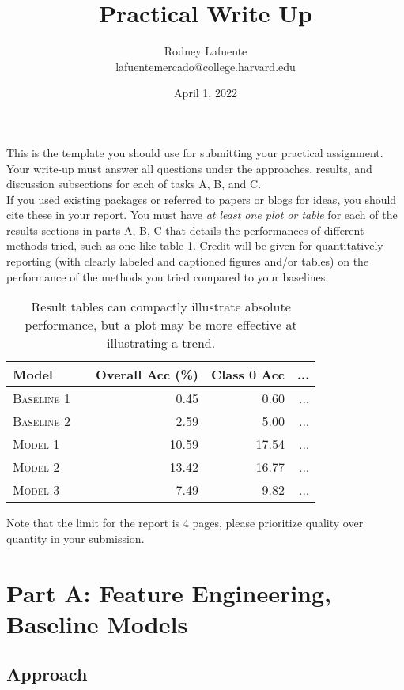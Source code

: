 \documentclass[11pt]{article}
\title{Practical Write Up}
\author{Rodney Lafuente \\ lafuentemercado@college.harvard.edu}
\date{April 1, 2022}
\begin{document}
\maketitle{}


\noindent This is the template you should use for submitting your practical assignment. 
Your write-up must
answer all questions under the approaches, results, and discussion subsections
for each of tasks A, B, and C. \\

\noindent If you used existing packages or referred to papers or blogs for ideas,  you should cite these in your report.  You must have \textit{at least one plot or table}
for each of the results sections in parts A, B, C
that details the performances of different methods tried, such as one like table \ref{tab:results}. Credit will be given for quantitatively reporting (with clearly
labeled and captioned figures and/or tables) on the performance of the
methods you tried compared to your baselines.\\

\begin{table}
\centering
\begin{tabular}{llrrr}
 \toprule
 Model &  & Overall Acc (\%) & Class 0 Acc & ... \\
 \midrule
 \textsc{Baseline 1} & & 0.45 & 0.60 & ...\\
 \textsc{Baseline 2} & & 2.59 & 5.00 & ... \\
 \textsc{Model 1} & & 10.59 & 17.54 & ... \\
 \textsc{Model 2} & &13.42 & 16.77 & ... \\
 \textsc{Model 3} & & 7.49 & 9.82 & ... \\
 \bottomrule
\end{tabular}
\caption{\label{tab:results} Result tables can compactly illustrate absolute performance, but a plot may be more effective at illustrating a trend.}
\end{table}


\noindent Note that the limit for the report is 4 pages, please prioritize quality over 
quantity in your submission.\\

\section{Part A: Feature Engineering, Baseline Models}

\subsection{Approach}
\end{document}
